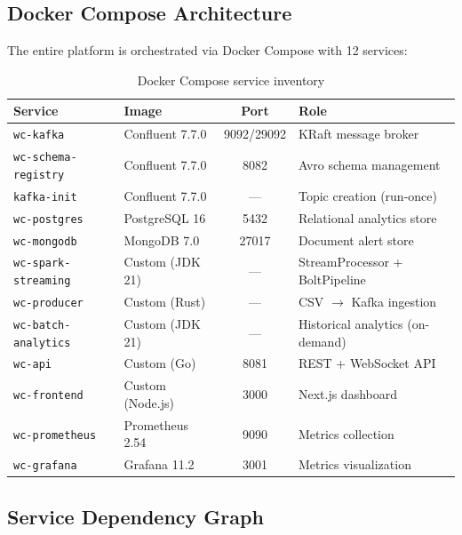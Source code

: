 \documentclass[12pt,a4paper]{article}
\begin{document}
\subsection{Docker Compose Architecture}

The entire platform is orchestrated via Docker Compose with 12 services:

\begin{table}[H]
\centering
\caption{Docker Compose service inventory}
\begin{tabularx}{\textwidth}{l l c X}
\toprule
\textbf{Service} & \textbf{Image} & \textbf{Port} & \textbf{Role} \\
\midrule
\texttt{wc-kafka} & Confluent 7.7.0 & 9092/29092 & KRaft message broker \\
\texttt{wc-schema-registry} & Confluent 7.7.0 & 8082 & Avro schema management \\
\texttt{kafka-init} & Confluent 7.7.0 & --- & Topic creation (run-once) \\
\texttt{wc-postgres} & PostgreSQL 16 & 5432 & Relational analytics store \\
\texttt{wc-mongodb} & MongoDB 7.0 & 27017 & Document alert store \\
\texttt{wc-spark-streaming} & Custom (JDK 21) & --- & StreamProcessor + BoltPipeline \\
\texttt{wc-producer} & Custom (Rust) & --- & CSV $\rightarrow$ Kafka ingestion \\
\texttt{wc-batch-analytics} & Custom (JDK 21) & --- & Historical analytics (on-demand) \\
\texttt{wc-api} & Custom (Go) & 8081 & REST + WebSocket API \\
\texttt{wc-frontend} & Custom (Node.js) & 3000 & Next.js dashboard \\
\texttt{wc-prometheus} & Prometheus 2.54 & 9090 & Metrics collection \\
\texttt{wc-grafana} & Grafana 11.2 & 3001 & Metrics visualization \\
\bottomrule
\end{tabularx}
\end{table}

\subsection{Service Dependency Graph}
\end{document}
